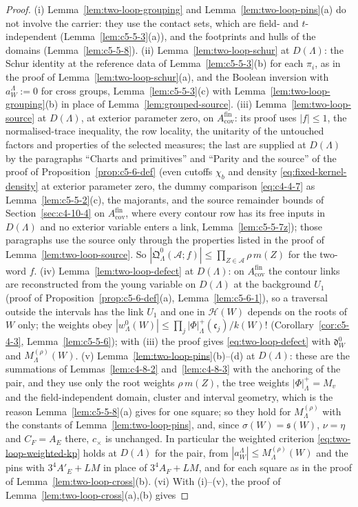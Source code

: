 \begin{proof}
(i) Lemma~\ref{lem:two-loop-grouping} and Lemma~\ref{lem:two-loop-pins}(a) do not involve the carrier: they use the contact sets, which are field- and $t$-independent (Lemma~\ref{lem:c5-5-3}(a)), and the footprints and hulls of the domains (Lemma~\ref{lem:c5-5-8}). (ii) Lemma~\ref{lem:two-loop-schur} at $D(\Lambda)$: the Schur identity at the reference data of Lemma~\ref{lem:c5-5-3}(b) for each $\pi_i$, as in the proof of Lemma~\ref{lem:two-loop-schur}(a), and the Boolean inversion with $a^\Lambda_W:=0$ for cross groups, Lemma~\ref{lem:c5-5-3}(c) with Lemma~\ref{lem:two-loop-grouping}(b) in place of Lemma~\ref{lem:grouped-source}. (iii) Lemma~\ref{lem:two-loop-source} at $D(\Lambda)$, at exterior parameter zero, on $A^{\mathrm{fin}}_{\mathrm{cov}}$: its proof uses $|f|\leq1$, the normalised-trace inequality, the row locality, the unitarity of the untouched factors and properties of the selected measures; the last are supplied at $D(\Lambda)$ by the paragraphs ``Charts and primitives'' and ``Parity and the source'' of the proof of Proposition~\ref{prop:c5-6-def} (even cutoffs $\chi_b$ and density \eqref{eq:fixed-kernel-density} at exterior parameter zero, the dummy comparison \eqref{eq:c4-4-7} as Lemma~\ref{lem:c5-5-2}(c), the majorants, and the source remainder bounds of Section~\ref{sec:c4-10-4} on $A^{\mathrm{fin}}_{\mathrm{cov}}$, where every contour row has its free inputs in $D(\Lambda)$ and no exterior variable enters a link, Lemma~\ref{lem:c5-5-7z}); those paragraphs use the source only through the properties listed in the proof of Lemma~\ref{lem:two-loop-source}. So $|\mathfrak Q^0_\Lambda(\mathcal A;f)|\leq\prod_{Z\in\mathcal A}\rho\,m(Z)$ for the two-word $f$. (iv) Lemma~\ref{lem:two-loop-defect} at $D(\Lambda)$: on $A^{\mathrm{fin}}_{\mathrm{cov}}$ the contour links are reconstructed from the young variable on $D(\Lambda)$ at the background $U_1$ (proof of Proposition~\ref{prop:c5-6-def}(a), Lemma~\ref{lem:c5-6-1}), so a traversal outside the intervals has the link $U_1$ and one in $\mathcal H(W)$ depends on the roots of $W$ only; the weights obey $|w^0_\Lambda(W)|\leq\prod_j|\Phi|^+_\Lambda(\mathfrak c_j)/k(W)!$ (Corollary~\ref{cor:c5-4-3}, Lemma~\ref{lem:c5-5-6}); with (iii) the proof gives \eqref{eq:two-loop-defect} with $\mathfrak d^0_W$ and $M^{(\rho)}_\Lambda(W)$. (v) Lemma~\ref{lem:two-loop-pins}(b)--(d) at $D(\Lambda)$: these are the summations of Lemmas~\ref{lem:c4-8-2} and~\ref{lem:c4-8-3} with the anchoring of the pair, and they use only the root weights $\rho\,m(Z)$, the tree weights $|\Phi|^+_\Lambda=M_v$ and the field-independent domain, cluster and interval geometry, which is the reason Lemma~\ref{lem:c5-5-8}(a) gives for one square; so they hold for $M^{(\rho)}_\Lambda$ with the constants of Lemma~\ref{lem:two-loop-pins}, and, since $\sigma(W)=\mathfrak s(W)$, $\nu=\eta$ and $C_F=A_E$ there, $c_\times$ is unchanged. In particular the weighted criterion \eqref{eq:two-loop-weighted-kp} holds at $D(\Lambda)$ for the pair, from $|a^\Lambda_W|\leq M^{(\rho)}_\Lambda(W)$ and the pins with $3^4A'_E+LM$ in place of $3^4A_F+LM$, and for each square as in the proof of Lemma~\ref{lem:two-loop-cross}(b). (vi) With (i)--(v), the proof of Lemma~\ref{lem:two-loop-cross}(a),(b) gives 
\end{proof}
